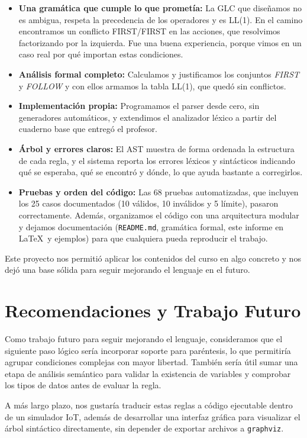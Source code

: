 \documentclass[12pt,a4paper]{article}
\begin{document}
\begin{itemize}[leftmargin=1cm]
    \item \textbf{Una gramática que cumple lo que prometía:} La GLC que diseñamos no es ambigua, respeta la precedencia de los operadores y es LL(1). En el camino encontramos un conflicto FIRST/FIRST en las acciones, que resolvimos factorizando por la izquierda. Fue una buena experiencia, porque vimos en un caso real por qué importan estas condiciones.
    \item \textbf{Análisis formal completo:} Calculamos y justificamos los conjuntos \textit{FIRST} y \textit{FOLLOW} y con ellos armamos la tabla LL(1), que quedó sin conflictos.
    \item \textbf{Implementación propia:} Programamos el parser desde cero, sin generadores automáticos, y extendimos el analizador léxico a partir del cuaderno base que entregó el profesor.
    \item \textbf{Árbol y errores claros:} El AST muestra de forma ordenada la estructura de cada regla, y el sistema reporta los errores léxicos y sintácticos indicando qué se esperaba, qué se encontró y dónde, lo que ayuda bastante a corregirlos.
    \item \textbf{Pruebas y orden del código:} Las 68 pruebas automatizadas, que incluyen los 25 casos documentados (10 válidos, 10 inválidos y 5 límite), pasaron correctamente. Además, organizamos el código con una arquitectura modular y dejamos documentación (\texttt{README.md}, gramática formal, este informe en \LaTeX\ y ejemplos) para que cualquiera pueda reproducir el trabajo.
\end{itemize}

Este proyecto nos permitió aplicar los contenidos del curso en algo concreto y nos dejó una base sólida para seguir mejorando el lenguaje en el futuro.

\section{Recomendaciones y Trabajo Futuro}

Como trabajo futuro para seguir mejorando el lenguaje, consideramos que el siguiente paso lógico sería incorporar soporte para paréntesis, lo que permitiría agrupar condiciones complejas con mayor libertad. También sería útil sumar una etapa de análisis semántico para validar la existencia de variables y comprobar los tipos de datos antes de evaluar la regla. 

A más largo plazo, nos gustaría traducir estas reglas a código ejecutable dentro de un simulador IoT, además de desarrollar una interfaz gráfica para visualizar el árbol sintáctico directamente, sin depender de exportar archivos a \texttt{graphviz}.
\end{document}
